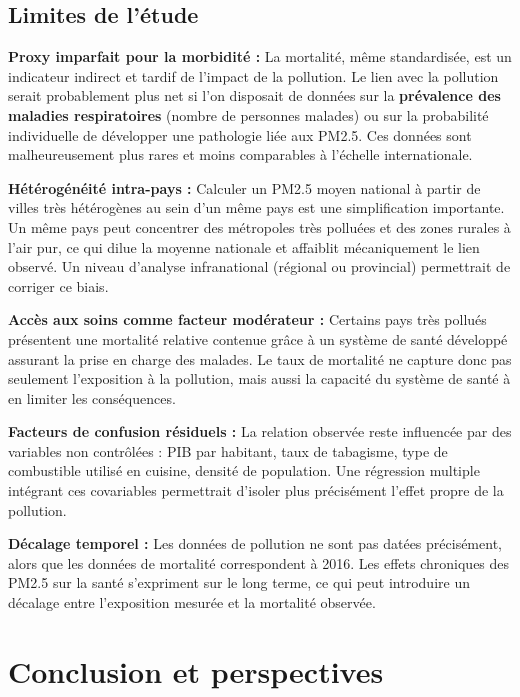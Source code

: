 \documentclass[mstat,12pt]{unswthesis}
\begin{document}
\section{Limites de l'étude}\label{limites-de-luxe9tude}

\textbf{Proxy imparfait pour la morbidité :} La mortalité, même
standardisée, est un indicateur indirect et tardif de l'impact de la
pollution. Le lien avec la pollution serait probablement plus net si
l'on disposait de données sur la \textbf{prévalence des maladies
respiratoires} (nombre de personnes malades) ou sur la probabilité
individuelle de développer une pathologie liée aux PM2.5. Ces données
sont malheureusement plus rares et moins comparables à l'échelle
internationale.

\textbf{Hétérogénéité intra-pays :} Calculer un PM2.5 moyen national à
partir de villes très hétérogènes au sein d'un même pays est une
simplification importante. Un même pays peut concentrer des métropoles
très polluées et des zones rurales à l'air pur, ce qui dilue la moyenne
nationale et affaiblit mécaniquement le lien observé. Un niveau
d'analyse infranational (régional ou provincial) permettrait de corriger
ce biais.

\textbf{Accès aux soins comme facteur modérateur :} Certains pays très
pollués présentent une mortalité relative contenue grâce à un système de
santé développé assurant la prise en charge des malades. Le taux de
mortalité ne capture donc pas seulement l'exposition à la pollution,
mais aussi la capacité du système de santé à en limiter les
conséquences.

\textbf{Facteurs de confusion résiduels :} La relation observée reste
influencée par des variables non contrôlées : PIB par habitant, taux de
tabagisme, type de combustible utilisé en cuisine, densité de
population. Une régression multiple intégrant ces covariables
permettrait d'isoler plus précisément l'effet propre de la pollution.

\textbf{Décalage temporel :} Les données de pollution ne sont pas datées
précisément, alors que les données de mortalité correspondent à 2016.
Les effets chroniques des PM2.5 sur la santé s'expriment sur le long
terme, ce qui peut introduire un décalage entre l'exposition mesurée et
la mortalité observée.

\chapter{Conclusion et perspectives}\label{conclusion-et-perspectives}
\end{document}
